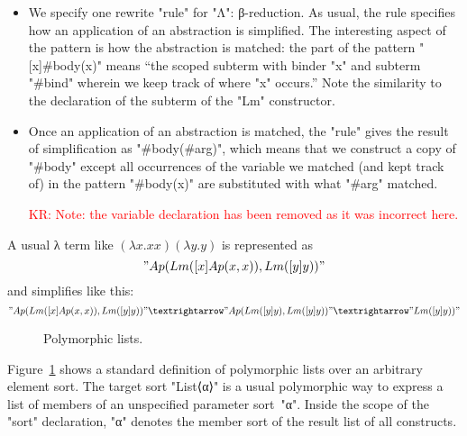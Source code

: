 \documentclass[letterpaper,11pt]{article}
\newcommand{\KR}[1]{\textcolor{red}{KR: #1}}
\begin{document}
\begin{example}
\begin{itemize}
  \item We specify one rewrite "rule" for "Λ": β-reduction. As usual, the rule specifies how an
    application of an abstraction is simplified. The interesting aspect of the pattern is how the
    abstraction is matched: the part of the pattern "[x]#body(x)" means ``the scoped subterm with
    binder "x" and subterm "#bind" wherein we keep track of where "x" occurs.'' Note the similarity
    to the declaration of the subterm of the "Lm" constructor.

  \item Once an application of an abstraction is matched, the "rule" gives the result of
    simplification as "#body(#arg)", which means that we construct a copy of "#body" except all
    occurrences of the variable we matched (and kept track of) in the pattern "#body(x)" are
    substituted with what "#arg" matched.

    \KR{Note: the variable declaration has been removed as it was incorrect here.}

  \end{itemize}
  A usual λ term like $(λx.x x)(λy.y)$ is represented as
  \begin{displaymath}
    "Ap(Lm([x]Ap(x, x)), Lm([y]y))"    
  \end{displaymath}
  and simplifies like this:
  \begin{displaymath}
    "Ap(Lm([x]Ap(x, x)), Lm([y]y))" →
    "Ap(Lm([y]y), Lm([y]y))" →
    "Lm([y]y))"
  \end{displaymath}
\end{example}

\begin{figure}[h!t]
  \vspace*{-1em}
  \caption{Polymorphic lists.}
  \label{fig:list}
\end{figure}

\begin{example}[lists]\label{ex:list}
  Figure~\ref{fig:list} shows a standard definition of polymorphic lists over an arbitrary element
  sort.  The target sort "List⟨α⟩" is a usual polymorphic way to express a list of members of an
  unspecified parameter sort~"α".  Inside the scope of the "sort" declaration, "α" denotes the
  member sort of the result list of all constructs.

\end{example}
\end{document}
